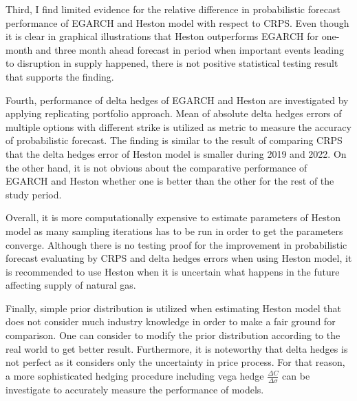 \documentclass[12pt,a4paper]{article}
\numberwithin{equation}{section}
\begin{document}
Third, I find limited evidence for the relative difference in probabilistic forecast performance of EGARCH and Heston model with respect to CRPS. Even though it is clear in graphical illustrations that Heston outperforms EGARCH for one-month and three month ahead forecast in period when important events leading to disruption in supply happened, there is not positive statistical testing result that supports the finding.  

Fourth, performance of delta hedges of EGARCH and Heston are investigated by applying replicating portfolio approach. Mean of absolute delta hedges errors of multiple options with different strike is utilized as metric to measure the accuracy of probabilistic forecast. The finding is similar to the result of comparing CRPS that the delta hedges error of Heston model is smaller during 2019 and 2022. On the other hand, it is not obvious about the comparative performance of EGARCH and Heston whether one is better than the other for the rest of the study period. 

Overall, it is more computationally expensive to estimate parameters of Heston model as many sampling iterations has to be run in order to get the parameters converge. Although there is no testing proof for the improvement in probabilistic forecast evaluating by CRPS and delta hedges errors when using Heston model, it is recommended to use Heston when it is uncertain what happens in the future affecting supply of natural gas.

Finally, simple prior distribution is utilized when estimating Heston model that does not consider much industry knowledge in order to make a fair ground for comparison. One can consider to modify the prior distribution according to the real world to get better result. Furthermore, it is noteworthy that delta hedges is not perfect as it considers only the uncertainty in price process. For that reason, a more sophisticated hedging procedure including vega hedge $\frac{\Delta C}{\Delta \sigma}$ can be investigate to accurately measure the performance of models. 
\end{document}
